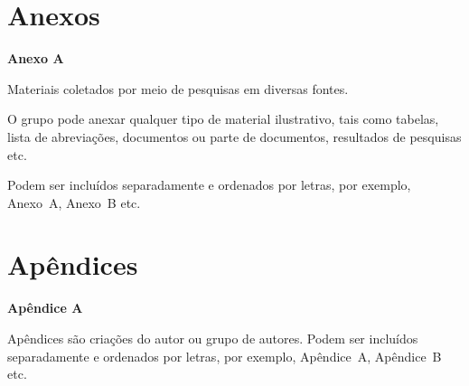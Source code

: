 \clearpage
\chapter*{Anexos}

\noindent\textbf{Anexo A}\label{anx:a}

\vspace{0.5\baselineskip}

Materiais coletados por meio de pesquisas em diversas fontes.

O grupo pode anexar qualquer tipo de material ilustrativo, tais como
tabelas, lista de abreviações, documentos ou parte de documentos, resultados
de pesquisas etc.

Podem ser incluídos separadamente e ordenados por letras, por exemplo,
Anexo~A, Anexo~B etc.

\clearpage
\chapter*{Apêndices}

\noindent\textbf{Apêndice A}\label{ape:a}

\vspace{0.5\baselineskip}

Apêndices são criações do autor ou grupo de autores. Podem ser incluídos
separadamente e ordenados por letras, por exemplo, Apêndice~A, Apêndice~B
etc.
